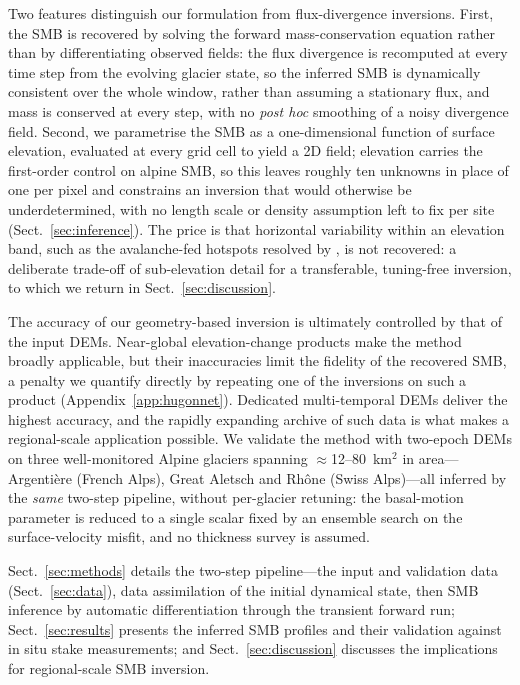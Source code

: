 Two features distinguish our formulation from flux-divergence inversions. First, the SMB is recovered by solving the forward mass-conservation equation rather than by differentiating observed fields: the flux divergence is recomputed at every time step from the evolving glacier state, so the inferred SMB is dynamically
consistent over the whole window, rather than assuming a stationary flux, and mass is conserved at every step, with no \emph{post hoc} smoothing of a noisy divergence field. Second, we parametrise the SMB as a one-dimensional function of surface elevation, evaluated at every grid cell to yield a 2D field;
elevation carries the first-order control on alpine SMB, so this leaves roughly ten unknowns in place of one per pixel and constrains an inversion that would otherwise be underdetermined, with no length scale or density assumption left to fix per site (Sect.~\ref{sec:inference}). The price is that horizontal variability within an elevation band, such as the avalanche-fed hotspots resolved by \citet{kneib2024}, is not recovered: a deliberate trade-off of sub-elevation detail for a transferable, tuning-free inversion, to which we return in Sect.~\ref{sec:discussion}.

The accuracy of our geometry-based inversion is ultimately controlled by that of the input DEMs. Near-global elevation-change products \citep{hugonnet2021} make the method broadly applicable, but their inaccuracies limit the fidelity of the recovered SMB, a penalty we quantify directly by repeating one of the inversions on such a product (Appendix~\ref{app:hugonnet}). Dedicated multi-temporal DEMs deliver the highest accuracy, and the rapidly expanding archive of such data is what makes a regional-scale application possible. We validate the method with two-epoch DEMs on three well-monitored Alpine glaciers spanning $\approx$12--80~km$^2$ in area---Argentière (French Alps), Great Aletsch and Rhône (Swiss Alps)---all inferred by the \emph{same} two-step pipeline, without per-glacier retuning: the basal-motion parameter is reduced to a single scalar fixed by an ensemble search on the surface-velocity misfit, and no thickness survey is assumed.

Sect.~\ref{sec:methods} details the two-step pipeline---the input and validation data (Sect.~\ref{sec:data}), data assimilation of the initial dynamical state, then SMB inference by
automatic differentiation through the transient forward run; Sect.~\ref{sec:results} presents the inferred SMB profiles and their validation against in situ stake measurements; and Sect.~\ref{sec:discussion} discusses the implications for regional-scale SMB inversion.

